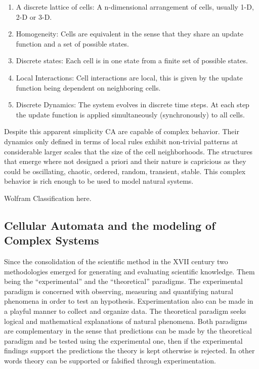 \documentclass[
]{book}
\begin{document}
\begin{enumerate}
\def\labelenumi{\arabic{enumi}.}
\item
  A discrete lattice of cells:
  A n-dimensional arrangement of cells, usually 1-D, 2-D or 3-D.
\item
  Homogeneity:
  Cells are equivalent in the sense that they share an update function and a set of possible states.
\item
  Discrete states:
  Each cell is in one state from a finite set of possible states.
\item
  Local Interactions:
  Cell interactions are local, this is given by the update function being dependent on neighboring cells.
\item
  Discrete Dynamics:
  The system evolves in discrete time steps. At each step the update function is applied simultaneously (synchronously) to all cells.
\end{enumerate}

Despite this apparent simplicity CA are capable of complex behavior. Their dynamics only defined in terms of local rules exhibit non-trivial patterns at considerable larger scales that the size of the cell neighborhoods. The structures that emerge where not designed a priori and their nature is capricious as they could be oscillating, chaotic, ordered, random, transient, stable. This complex behavior is rich enough to be used to model natural systems.

Wolfram Classification here.

\hypertarget{cellular-automata-and-the-modeling-of-complex-systems}{%
\subsection{Cellular Automata and the modeling of Complex Systems}\label{cellular-automata-and-the-modeling-of-complex-systems}}

Since the consolidation of the scientific method in the XVII century two methodologies emerged for generating and evaluating scientific knowledge. Them being the ``experimental'' and the ``theoretical'' paradigms. The experimental paradigm is concerned with observing, measuring and quantifying natural phenomena in order to test an hypothesis. Experimentation also can be made in a playful manner to collect and organize data. The theoretical paradigm seeks logical and mathematical explanations of natural phenomena. Both paradigms are complementary in the sense that predictions can be made by the theoretical paradigm and be tested using the experimental one, then if the experimental findings support the predictions the theory is kept otherwise is rejected. In other words theory can be supported or falsified through experimentation.
\end{document}
